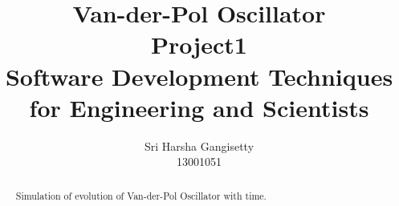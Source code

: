 \documentclass[a4paper]{article}
\title{Van-der-Pol Oscillator\\
			\large Project1 \\
			\large Software Development Techniques for Engineering and Scientists}
\author{Sri Harsha Gangisetty \\
					13001051}
\begin{document}
\maketitle

\begin{abstract}
Simulation of evolution of Van-der-Pol Oscillator with time.
\end{abstract}
\end{document}
